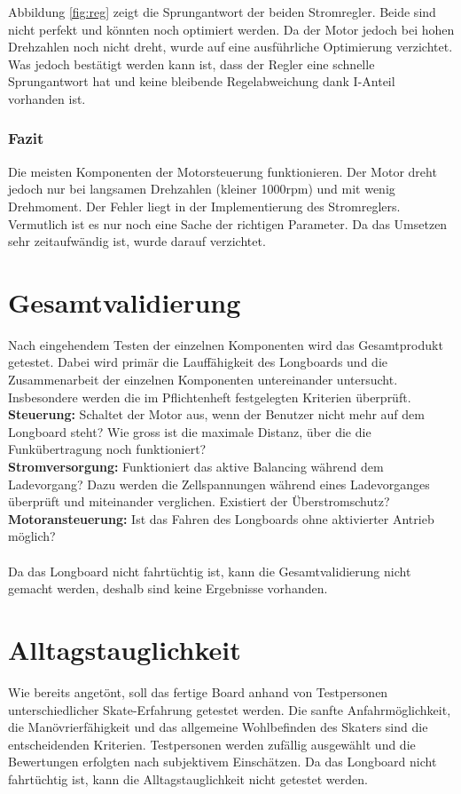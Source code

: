 Abbildung \ref{fig:reg} zeigt die Sprungantwort der beiden Stromregler. Beide sind nicht perfekt und könnten noch optimiert werden. Da der Motor jedoch bei hohen Drehzahlen noch nicht dreht, wurde auf eine ausführliche Optimierung verzichtet. Was jedoch bestätigt werden kann ist, dass der Regler eine schnelle Sprungantwort hat und keine bleibende Regelabweichung dank I-Anteil vorhanden ist.


\subsubsection*{Fazit}
Die meisten Komponenten der Motorsteuerung funktionieren. Der Motor dreht jedoch nur bei langsamen Drehzahlen (kleiner 1000rpm) und mit wenig Drehmoment. Der Fehler liegt in der Implementierung des Stromreglers. Vermutlich ist es nur noch eine Sache der richtigen Parameter. Da das Umsetzen sehr zeitaufwändig ist, wurde darauf verzichtet.


\section{Gesamtvalidierung}
\label{ValidGesamtv}
Nach eingehendem Testen der einzelnen Komponenten wird das Gesamtprodukt getestet. Dabei wird primär die Lauffähigkeit des Longboards und die Zusammenarbeit der einzelnen Komponenten untereinander untersucht. Insbesondere werden die im Pflichtenheft festgelegten Kriterien überprüft. \\
\textbf{Steuerung:} Schaltet der Motor aus, wenn der Benutzer nicht mehr auf dem Longboard steht? Wie gross ist die maximale Distanz, über die die Funkübertragung noch funktioniert? \\
\textbf{Stromversorgung:} Funktioniert das aktive Balancing während dem Ladevorgang? Dazu werden die Zellspannungen während eines Ladevorganges überprüft und miteinander verglichen. Existiert der Überstromschutz?\\ 
\textbf{Motoransteuerung:} Ist das Fahren des Longboards ohne aktivierter Antrieb möglich? \\
\\
Da das Longboard nicht fahrtüchtig ist, kann die Gesamtvalidierung nicht gemacht werden, deshalb sind keine Ergebnisse vorhanden.

\section{Alltagstauglichkeit}
\label{ValidAlltag}
Wie bereits angetönt, soll das fertige Board anhand von Testpersonen unterschiedlicher Skate-Erfahrung getestet werden. Die sanfte Anfahrmöglichkeit, die Manövrierfähigkeit und das allgemeine Wohlbefinden des Skaters sind die entscheidenden Kriterien. 
Testpersonen werden zufällig ausgewählt und die Bewertungen erfolgten nach subjektivem Einschätzen. 
Da das Longboard nicht fahrtüchtig ist, kann die Alltagstauglichkeit nicht getestet werden.


